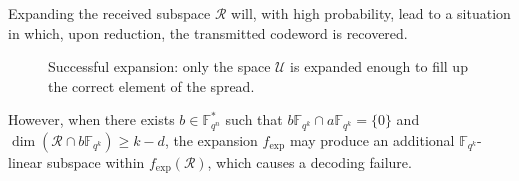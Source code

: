 \documentclass{article}
\newcommand{\Fqn}{\mathbb{F}_{q^n}}
\newcommand{\Fqk}{\mathbb{F}_{q^k}}
\newcommand{\calB}{\mathcal{B}}
\newcommand{\calR}{\mathcal{R}}
\newcommand{\calU}{\mathcal{U}}
\newcommand{\fexp}{f_{\mathrm{exp}}}
\begin{document}
    Expanding the received subspace $\calR$ will, with high probability, lead to a situation in which, upon reduction, the transmitted codeword is recovered.
    \begin{figure}[H]
        \centering
        \caption{Successful expansion: only the space $\calU$ is expanded enough to fill up the correct element of the spread.}
        \label{fig: Successful Expansion}
    \end{figure}
    However, when there exists $b \in \Fqn^*$ such that $b\Fqk\cap a\Fqk=\{0\}$ and $\dim(\calR \cap b \Fqk)\geq k-d$, the expansion $\fexp$ may produce an additional $\Fqk$-linear subspace within $\fexp(\calR)$, which causes a decoding failure.
\end{document}
